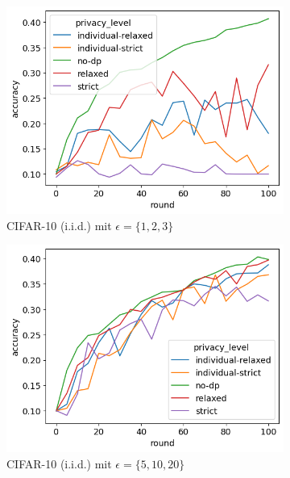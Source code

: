 \begin{figure}[t!]
	\centering
	\begin{subfigure}{0.45\textwidth}
		\centering
		\includegraphics[width=\linewidth]{Bilder/cifar10-accuracy-iid-eps-1-2-3.png}
		\caption{CIFAR-10 (i.i.d.) mit $\epsilon = \{1,2,3\}$}
	\end{subfigure}
	\begin{subfigure}{0.45\textwidth}
		\centering
		\includegraphics[width=\linewidth]{Bilder/cifar10-accuracy-iid-eps-5-10-20.png}
		\caption{CIFAR-10 (i.i.d.) mit $\epsilon = \{5,10,20\}$}
	\end{subfigure}
	\begin{subfigure}{0.45\textwidth}
		\centering

\end{subfigure}
\end{figure}
